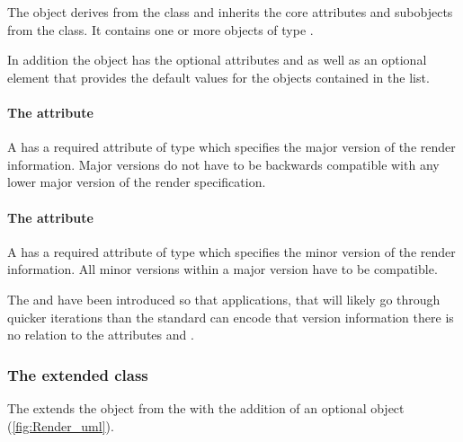 The \ListOfGlobalRenderInformation object derives from the
 class and inherits the core attributes and subobjects from the
 class. It contains one or more objects of type
\GlobalRenderInformation.

In addition the \ListOfGlobalRenderInformation object has the optional attributes 
 and  as well as an optional \DefaultValues 
element that provides the default values for the \GlobalRenderInformation objects
contained in the list.

\paragraph{The \fixttspace{} attribute}

A \ListOfGlobalRenderInformation has a required attribute
 of type  which specifies the major version of the render information. Major versions do not have to be backwards compatible with any lower major version of the render specification.

\paragraph{The \fixttspace{} attribute}

A \ListOfGlobalRenderInformation has a required attribute
 of type  which specifies the minor version of the render information.  All minor versions within a major version have to be compatible.

The  and  have been introduced so that 
applications, that will likely go through quicker iterations than the \SBML standard
can encode that version information there is no relation to the \SBML attributes 
 and . 

\subsubsection{The extended  class}
\label{layout-class}

The \RenderPackage extends the  object from the \LayoutPackage with the addition
of an optional  \ListOfLocalRenderInformation object (\ref{fig:Render_uml}).

